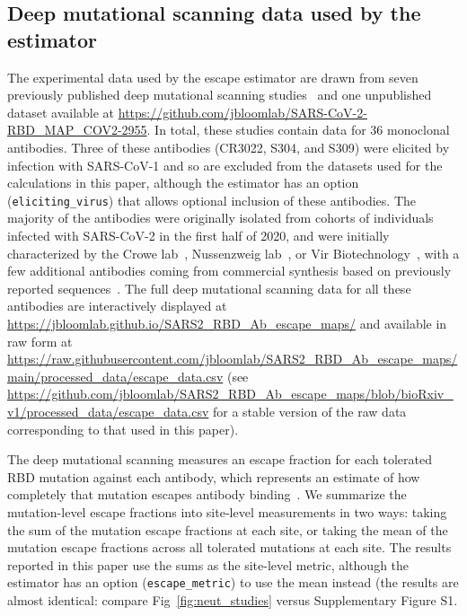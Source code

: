 \documentclass[9pt,twocolumn,twoside]{gsajnl_modified}
\begin{document}
{\subsection{Deep mutational scanning data used by the estimator}
The experimental data used by the escape estimator are drawn from seven previously published deep mutational scanning studies~\citep{greaney2021complete,greaney2021mapping,starr2021prospective,starr2021complete,starr2021sars,dong2021genetic,tortorici2021broad} and one unpublished dataset available at \url{https://github.com/jbloomlab/SARS-CoV-2-RBD_MAP_COV2-2955}.
In total, these studies contain data for 36 monoclonal antibodies.
Three of these antibodies (CR3022, S304, and S309) were elicited by infection with SARS-CoV-1 and so are excluded from the datasets used for the calculations in this paper, although the estimator has an option (\texttt{eliciting\_virus}) that allows optional inclusion of these antibodies.
The majority of the antibodies were originally isolated from cohorts of individuals infected with SARS-CoV-2 in the first half of 2020, and were initially characterized by the Crowe lab~\citep{zost2020potently}, Nussenzweig lab~\citep{robbiani2020convergent}, or Vir Biotechnology~\citep{piccoli2020mapping}, with a few additional antibodies coming from commercial synthesis based on previously reported sequences~\citep{hansen2020studies,jones2021neutralizing,shi2020human}.
The full deep mutational scanning data for all these antibodies are interactively displayed at \url{https://jbloomlab.github.io/SARS2_RBD_Ab_escape_maps/} and available in raw form at \url{https://raw.githubusercontent.com/jbloomlab/SARS2_RBD_Ab_escape_maps/main/processed_data/escape_data.csv} (see \url{https://github.com/jbloomlab/SARS2_RBD_Ab_escape_maps/blob/bioRxiv_v1/processed_data/escape_data.csv} for a stable version of the raw data corresponding to that used in this paper).

The deep mutational scanning measures an escape fraction for each tolerated RBD mutation against each antibody, which represents an estimate of how completely that mutation escapes antibody binding~\citep{greaney2021complete}.
We summarize the mutation-level escape fractions into site-level measurements in two ways: taking the sum of the mutation escape fractions at each site, or taking the mean of the mutation escape fractions across all tolerated mutations at each site.
The results reported in this paper use the sums as the site-level metric, although the estimator has an option (\texttt{escape\_metric}) to use the mean instead (the results are almost identical: compare Fig~\ref{fig:neut_studies} versus Supplementary Figure S1.

}
\end{document}

